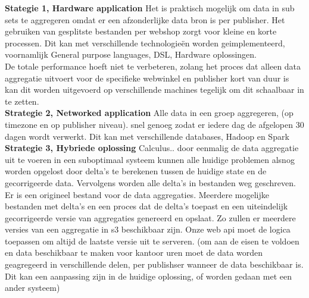 \textbf{Stategie 1, Hardware application} 
Het is praktisch mogelijk om data in sub sets te aggregeren omdat er een afzonderlijke data bron is per publisher. 
Het gebruiken van gesplitste bestanden per webshop zorgt voor kleine  en korte processen. Dit kan met verschillende technologieën worden geimplementeerd, voornamlijk General purpose languages, DSL, Hardware oplossingen. \\

De totale performance hoeft niet te verbeteren, zolang het proces dat alleen data aggregatie uitvoert voor de specifieke webwinkel en publisher kort van duur is kan dit worden uitgevoerd op verschillende machines tegelijk om dit schaalbaar in te zetten. \\
    
\textbf{Strategie 2, Networked application}
Alle data in een groep aggregeren, (op timezone en op publisher niveau). snel genoeg zodat er iedere dag de afgelopen 30 dagen wordt verwerkt.
Dit kan met verschillende databases, Hadoop en Spark \\

\textbf{Strategie 3, Hybriede oplossing} Calculus..
door eenmalig de data aggregatie uit te voeren in een suboptimaal systeem kunnen alle huidige problemen alsnog worden opgelost door delta's te berekenen tussen de huidige state en de gecorrigeerde data. Vervolgens worden alle delta's in bestanden weg geschreven. \\

Er is een origineel bestand voor de data aggregaties. Meerdere mogelijke bestanden met delta's en een proces dat de delta's toepast en een uiteindelijk gecorrigeerde versie van aggregaties genereerd en opslaat. 
Zo zullen er meerdere versies van een aggregatie in s3 beschikbaar zijn. Onze web api moet de logica toepassen om altijd de laatste versie uit te serveren. 
(om aan de eisen te voldoen en data beschikbaar te maken voor kantoor uren moet de data worden geagregeerd in verschillende delen, per publishser wanneer de data beschikbaar is. Dit kan een aanpassing zijn in de huidige oplossing, of worden gedaan met een ander systeem)
